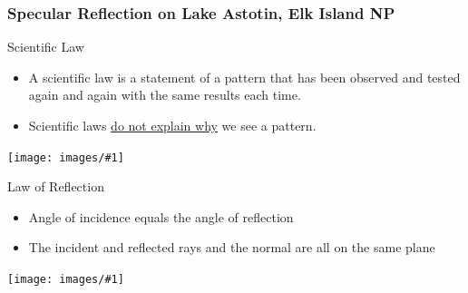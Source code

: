 \documentclass[t]{beamer}
\newcommand{\img}[1]{\texttt{[image: images/\#1]}}
\newcommand{\bi}{\begin{itemize}}
\newcommand{\ei}{\end{itemize}}
\begin{document}
{
\begin{frame}[plain]
\frametitle{Specular Reflection on Lake Astotin, Elk Island NP}
\end{frame}
}

\begin{frame}{Scientific Law}
\bi
\item A scientific law is a statement of a pattern that has been observed and tested again and again with the same results each time. \item Scientific laws \underline{do not explain why} we see a pattern.
\ei
\img{law-of-gravity-enforced.jpg}
\end{frame}

\begin{frame}{Law of Reflection}
\bi
\item Angle of incidence equals the angle of reflection
\item The incident and reflected rays and the normal are all on the same plane
\ei
\img{law_of_reflection.png}
\end{frame}
\end{document}
